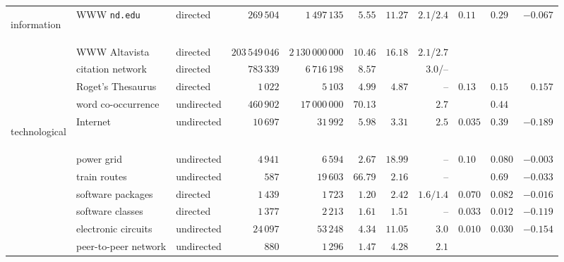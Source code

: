 \begin{table}[!hbt]
{\begin{minipage}{\textwidth}
\begin{tabular}{l|l|l|r|r|r|r|r|l|l|r|}
 &         &         &          \\
\hline
\begin{rotate}{90}
\hbox{\hspace{-4.9em}information}
\end{rotate}
 & WWW \texttt{nd.edu}       & directed   & $269\,504$      & $1\,497\,135$      & $5.55$  & $11.27$ & $2.1$/$2.4$
 & $0.11$  & $0.29$  & $-0.067$  \\
 & WWW Altavista             & directed   & $203\,549\,046$ & $2\,130\,000\,000$ & $10.46$ & $16.18$ & $2.1$/$2.7$
 &         &         &           \\
 & citation network          & directed   & $783\,339$      & $6\,716\,198$      & $8.57$  &         & $3.0$/--
 &         &         &           \\
 & Roget's Thesaurus         & directed   & $1\,022$        & $5\,103$           & $4.99$  & $4.87$  & --
 & $0.13$  & $0.15$  & $0.157$   \\
 & word co-occurrence        & undirected & $460\,902$      & $17\,000\,000$     & $70.13$ &         & $2.7$
 &         & $0.44$  &           \\
\hline
\begin{rotate}{90}
\hbox{\hspace{-6.5em}technological}
\end{rotate}
 & Internet                  & undirected & $10\,697$       & $31\,992$          & $5.98$  & $3.31$  & $2.5$
 & $0.035$ & $0.39$  & $-0.189$  \\
 & power grid                & undirected & $4\,941$        & $6\,594$           & $2.67$  & $18.99$ & --
 & $0.10$  & $0.080$ & $-0.003$  \\
 & train routes              & undirected & $587$           & $19\,603$          & $66.79$ & $2.16$  & --
 &         & $0.69$  & $-0.033$  \\
 & software packages         & directed   & $1\,439$        & $1\,723$           & $1.20$  & $2.42$  & $1.6/1.4$
 & $0.070$ & $0.082$ & $-0.016$  \\
 & software classes          & directed   & $1\,377$        & $2\,213$           & $1.61$  & $1.51$  & --
 & $0.033$ & $0.012$ & $-0.119$  \\
 & electronic circuits       & undirected & $24\,097$       & $53\,248$          & $4.34$  & $11.05$ & $3.0$
 & $0.010$ & $0.030$ & $-0.154$  \\
 & peer-to-peer network      & undirected & $880$           & $1\,296$           & $1.47$  & $4.28$  & $2.1$

\end{tabular}
\end{minipage}}
\end{table}

